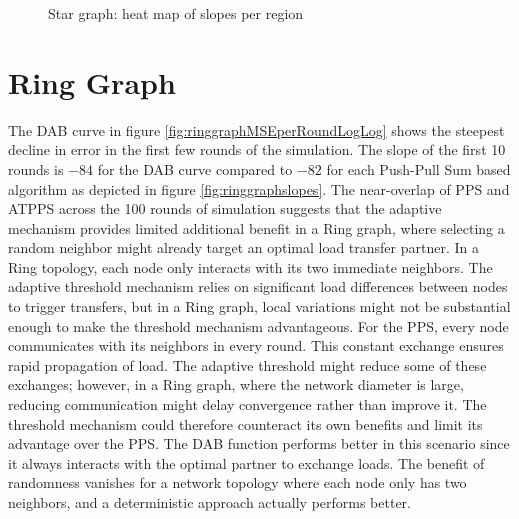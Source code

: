 \begin{figure}
    \centering
    \caption{Star graph: heat map of slopes per region}
    \label{fig:stargraphslopes}
\end{figure}

\section{Ring Graph}\label{sec:ringgraph}
The DAB curve in figure \ref{fig:ringgraphMSEperRoundLogLog} shows the steepest decline in error in the first few rounds of the simulation. The slope of the first 10 rounds is $-84$ for the DAB curve compared to $-82$ for each Push-Pull Sum based algorithm as depicted in figure \ref{fig:ringgraphslopes}. The near-overlap of PPS and ATPPS across the 100 rounds of simulation suggests that the adaptive mechanism provides limited additional benefit in a Ring graph, where selecting a random neighbor might already target an optimal load transfer partner. In a Ring topology, each node only interacts with its two immediate neighbors. The adaptive threshold mechanism relies on significant load differences between nodes to trigger transfers, but in a Ring graph, local variations might not be substantial enough to make the threshold mechanism advantageous. For the PPS, every node communicates with its neighbors in every round. This constant exchange ensures rapid propagation of load. The adaptive threshold might reduce some of these exchanges; however, in a Ring graph, where the network diameter is large, reducing communication might delay convergence rather than improve it. The threshold mechanism could therefore counteract its own benefits and limit its advantage over the PPS. The DAB function performs better in this scenario since it always interacts with the optimal partner to exchange loads. The benefit of randomness vanishes for a network topology where each node only has two neighbors, and a deterministic approach actually performs better.

